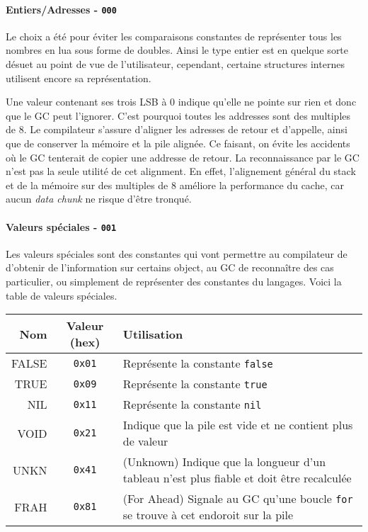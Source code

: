 \documentclass{article}
\begin{document}
\paragraph{Entiers/Adresses - \texttt{000}}
Le choix a été pour éviter les comparaisons constantes de représenter tous les nombres en lua sous forme de doubles. Ainsi le type entier est en quelque sorte désuet au point de vue de l'utilisateur, cependant, certaine structures internes utilisent encore sa représentation.

Une valeur contenant ses trois LSB à 0 indique qu'elle ne pointe sur rien et donc que le GC peut l'ignorer. C'est pourquoi toutes les addresses sont des multiples de 8. Le compilateur s'assure d'aligner les adresses de retour et d'appelle, ainsi que de conserver la mémoire et la pile alignée. Ce faisant, on évite les accidents où le GC tenterait de copier une addresse de retour. La reconnaissance par le GC n'est pas la seule utilité de cet alignment. En effet, l'alignement général du stack et de la mémoire sur des multiples de 8 améliore la performance du cache, car aucun \textit{data chunk} ne risque d'être tronqué.
\paragraph{Valeurs spéciales - \texttt{001}}
Les valeurs spéciales sont des constantes qui vont permettre au compilateur de d'obtenir de l'information sur certains object, au GC de reconnaître des cas particulier, ou simplement de représenter des constantes du langages. Voici la table de valeurs spéciales.
\begin{center}
  \begin{tabular}{r|c|p{12cm}}
    Nom & Valeur (hex) & Utilisation\\
    \hline
    FALSE & \texttt{0x01} & Représente la constante {\lstset{style=lua}\lstinline$false$}\\
    TRUE  & \texttt{0x09} & Représente la constante {\lstset{style=lua}\lstinline$true$}\\
    NIL   & \texttt{0x11} & Représente la constante {\lstset{style=lua}\lstinline$nil$}\\
    VOID  & \texttt{0x21} & Indique que la pile est vide et ne contient plus de valeur\\
    UNKN  & \texttt{0x41} & (Unknown) Indique que la longueur d'un tableau n'est plus fiable et doit être recalculée\\
    FRAH  & \texttt{0x81} & (For Ahead) Signale au GC qu'une boucle {\lstset{style=lua}\lstinline$for$} se trouve à cet endoroit sur la pile\\
  \end{tabular}
\end{center}
\end{document}
